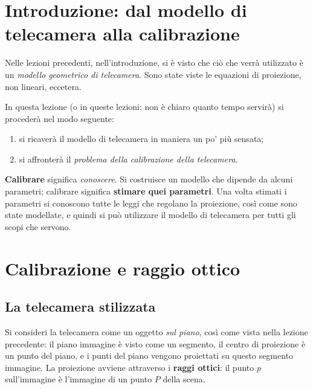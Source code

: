 
\section{Introduzione: dal modello di telecamera alla calibrazione}

Nelle lezioni precedenti, nell'introduzione, si è visto che ciò che verrà utilizzato è un \emph{modello geometrico di telecamera}. Sono state viste le equazioni di proiezione, non lineari, eccetera.

In questa lezione (o in queste lezioni: non è chiaro quanto tempo servirà) si procederà nel modo seguente:
\begin{enumerate}[label=\arabic*.]
  \item si ricaverà il modello di telecamera in maniera un po' più sensata;
  \item si affronterà il \emph{problema della calibrazione della telecamera}.
\end{enumerate}

\textbf{Calibrare} significa \emph{conoscere}. Si costruisce un modello che dipende da alcuni parametri; calibrare significa \textbf{stimare quei parametri}. Una volta stimati i parametri si conoscono tutte le leggi che regolano la proiezione, così come sono state modellate, e quindi si può utilizzare il modello di telecamera per tutti gli scopi che servono.

\section{Calibrazione e raggio ottico}

\subsection{La telecamera stilizzata}

Si consideri la telecamera come un oggetto \emph{sul piano}, così come vista nella lezione precedente: il piano immagine è visto come un segmento, il centro di proiezione è un punto del piano, e i punti del piano vengono proiettati su questo segmento immagine. La proiezione avviene attraverso i \textbf{raggi ottici}: il punto $p$ sull'immagine è l'immagine di un punto $P$ della scena.

